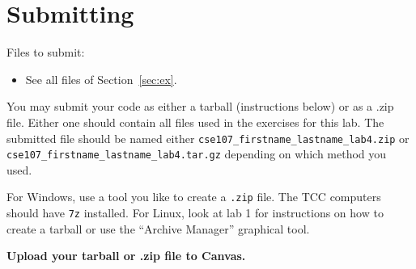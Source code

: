 \documentclass[11pt]{cselabheader}
\begin{document}
\section{Submitting}

Files to submit:
\begin{itemize}
  \item See all files of Section~\ref{sec:ex}.
\end{itemize}

You may submit your code as either a tarball (instructions below) or as a .zip
file. Either one should contain all files used in the exercises for this lab.
The submitted file should be named either
\texttt{cse107\_firstname\_lastname\_lab4.zip} or
\texttt{cse107\_firstname\_lastname\_lab4.tar.gz} depending on which method you
used.

For Windows, use a tool you like to create a \texttt{.zip} file. The TCC
computers should have \texttt{7z} installed. For Linux, look at lab 1 for
instructions on how to create a tarball or use the ``Archive Manager'' graphical
tool.

\begin{center}
  \textbf{Upload your tarball or .zip file to Canvas.}
\end{center}
\end{document}
